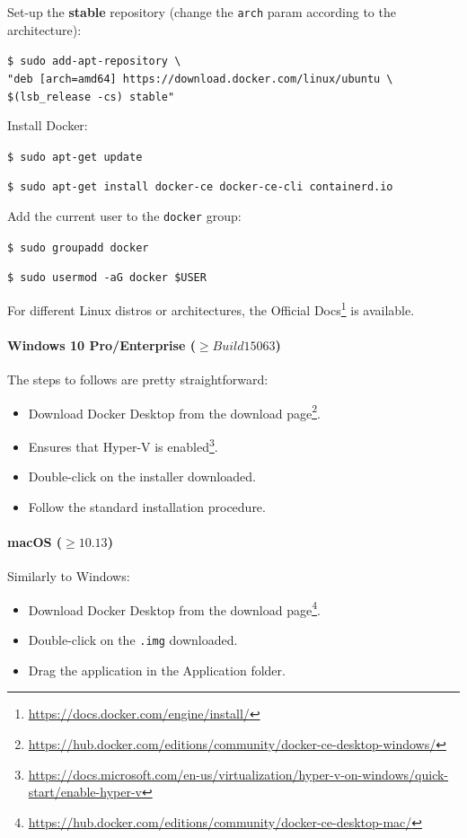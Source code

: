 \noindent Set-up the \textbf{stable} repository (change the \texttt{arch} param according to the architecture):

  \texttt{\$ sudo add-apt-repository \textbackslash} \\
  \indent \hspace{0.8cm} \texttt{"deb [arch=amd64] https://download.docker.com/linux/ubuntu \textbackslash} \\
  \indent \hspace{0.8cm} \texttt{\$(lsb\_release -cs) stable"}

\noindent Install Docker:

  \texttt{\$ sudo apt-get update}
  
  \texttt{\$ sudo apt-get install docker-ce docker-ce-cli containerd.io}

\noindent Add the current user to the \texttt{docker} group:
  
  \texttt{\$ sudo groupadd docker}
  
  \texttt{\$ sudo usermod -aG docker \$USER}

\noindent For different Linux distros or architectures, the Official Docs\footnote{\url{https://docs.docker.com/engine/install/}} is available.

\paragraph{Windows 10 Pro/Enterprise ($\geq Build 15063$)} The steps to follows are pretty straightforward:

\begin{itemize}
    \item[1.] Download Docker Desktop from the download page\footnote{\url{https://hub.docker.com/editions/community/docker-ce-desktop-windows/}}.
    \item[2.] Ensures that Hyper-V is enabled\footnote{\url{https://docs.microsoft.com/en-us/virtualization/hyper-v-on-windows/quick-start/enable-hyper-v}}.
    \item[3.] Double-click on the installer downloaded.
    \item[4.] Follow the standard installation procedure.
\end{itemize}

\paragraph{macOS ($\geq 10.13$)} Similarly to Windows:

\begin{itemize}
    \item[1.] Download Docker Desktop from the download page\footnote{\url{https://hub.docker.com/editions/community/docker-ce-desktop-mac/}}.
    \item[2.] Double-click on the \texttt{.img} downloaded.
    \item[3.] Drag the application in the Application folder.
\end{itemize}

